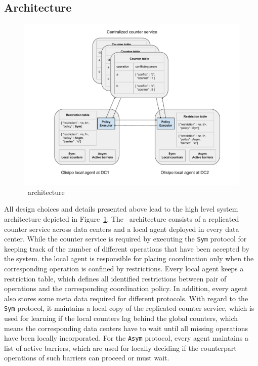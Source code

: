 \subsection{Architecture}
\label{sec:tool}
\begin{figure}[t!]
\centering
\includegraphics[width=\columnwidth]{./figures/tool_support.pdf}
\caption{\coordtool\ architecture}
\label{fig:tooldesign}
\end{figure}

All design choices and details presented above lead to the high level system architecture 
depicted in Figure~\ref{fig:tooldesign}. The \coordtool\ architecture consists of a replicated counter service across data centers and a local agent deployed
in every data center. While the counter service is required by executing the {\tt Sym} protocol
for keeping track of the number of different operations that have been accepted by the system.
the local agent is responsible for placing coordination only when the corresponding
operation is confined by restrictions. Every local agent keeps a restriction table, which defines
all identified restrictions between pair of operations and the corresponding coordination policy.
In addition, every agent also stores some meta data required for different protocols. With regard
to the {\tt Sym} protocol, it maintains a local copy of the replicated counter service, which is used
for learning if the local counters lag behind the global counters, which means
the corresponding data centers have to wait until all missing operations have been locally
incorporated. For the {\tt Asym} protocol, every agent maintains a list of active barriers, which
are used for locally deciding if the counterpart operations of such barriers can proceed or must wait.

